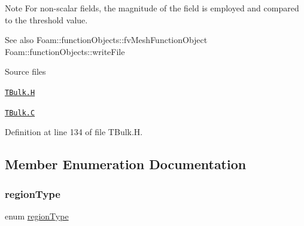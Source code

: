 \begin{DoxyNote}{Note}
For non-\/scalar fields, the magnitude of the field is employed and compared to the threshold value.
\end{DoxyNote}
\begin{DoxySeeAlso}{See also}
Foam\+::function\+Objects\+::fv\+Mesh\+Function\+Object Foam\+::function\+Objects\+::write\+File
\end{DoxySeeAlso}
\begin{DoxyParagraph}{Source files}

\begin{DoxyItemize}
\item \href{../../../home/carlo/data/GeN-Foam/GeN-Foam_ffn/GeN-Foam/GeN-Foam/classes/thermalHydraulics/src/functionObjects/TBulk/TBulk.H}{\tt T\+Bulk.\+H} 
\item \href{../../../home/carlo/data/GeN-Foam/GeN-Foam_ffn/GeN-Foam/GeN-Foam/classes/thermalHydraulics/src/functionObjects/TBulk/TBulk.C}{\tt T\+Bulk.\+C} 
\end{DoxyItemize}
\end{DoxyParagraph}


Definition at line 134 of file T\+Bulk.\+H.



\subsection{Member Enumeration Documentation}
\mbox{\label{classFoam_1_1functionObjects_1_1TBulk_a2c25b4a3d851e2d45d7a435a73598323}} 
\subsubsection{\texorpdfstring{region\+Type}{regionType}}
{\footnotesize\ttfamily enum \hyperlink{classFoam_1_1functionObjects_1_1TBulk_a2c25b4a3d851e2d45d7a435a73598323}{region\+Type}}

